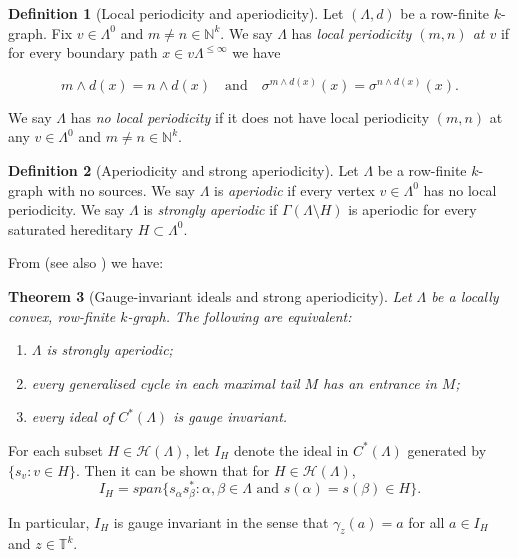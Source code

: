 \documentclass[12pt]{amsart}
\theoremstyle{plain}
\newtheorem{theorem}{Theorem}[section]
\theoremstyle{definition}
\newtheorem{definition}[theorem]{Definition}
\theoremstyle{remark}
\newcommand{\N}{\mathbb{N}}
\begin{document}
\begin{definition}[Local periodicity and aperiodicity]\label{def:local-per}
Let $(\Lambda,d)$ be a row-finite $k$-graph. Fix $v\in\Lambda^0$ and
$m\neq n\in\N^k$. We say $\Lambda$ has \emph{local periodicity $(m,n)$
at $v$} if for every boundary path $x\in v \Lambda^{\le \infty}$ we have


\[
m\wedge d(x) = n\wedge d(x)\quad\text{and}\quad
\sigma^{m\wedge d(x)}(x) = \sigma^{n\wedge d(x)}(x).
\]

\noindent
We say $\Lambda$ has \emph{no local periodicity} if it does not have
local periodicity $(m,n)$ at any $v\in\Lambda^0$ and $m\neq n\in\N^k$.
\end{definition}

\begin{definition}[Aperiodicity and strong aperiodicity]\label{def:aperiodic}
Let $\Lambda$ be a row-finite $k$-graph with no sources.
We say $\Lambda$ is \emph{aperiodic} if every vertex $v\in\Lambda^0$
has no local periodicity. We say $\Lambda$ is \emph{strongly aperiodic}
if $\Gamma (\Lambda\setminus H)$ is aperiodic for every saturated hereditary
$H\subset\Lambda^0$.
\end{definition}

\noindent
From \cite[Theorem 3.2, Corollary 3.9]{PSS2} (see also \cite[Theorem 7.2]{S}) we have:

\begin{theorem}[Gauge-invariant ideals and strong aperiodicity]\label{thm:gauge-invariant}
Let $\Lambda$ be a locally convex, row-finite $k$-graph. The following
are equivalent:
\begin{enumerate}
\item $\Lambda$ is strongly aperiodic;
\item every generalised cycle in each maximal tail $M$ has an entrance
      in $M$;
\item every ideal of $C^*(\Lambda)$ is gauge invariant.
\end{enumerate}
\end{theorem}

\noindent
For each subset $H \in \mathcal{H} ( \Lambda )$, let $I_H$ denote the ideal in $C^* (\Lambda )$ generated by $\{ s_v : v \in H \}$. Then it can be shown that for $H \in \mathcal{H} ( \Lambda )$,
\[
I_H = span \{s_\alpha  s_\beta^* : \alpha, \beta \in \Lambda \text{ and } s(\alpha)= s( \beta ) \in  H \}.
\]

\noindent
In particular, $I_H$ is gauge invariant in the sense that $\gamma_z(a)= a$ for all $a \in I_H$ and $z \in \mathbb{T}^k$.
\end{document}
